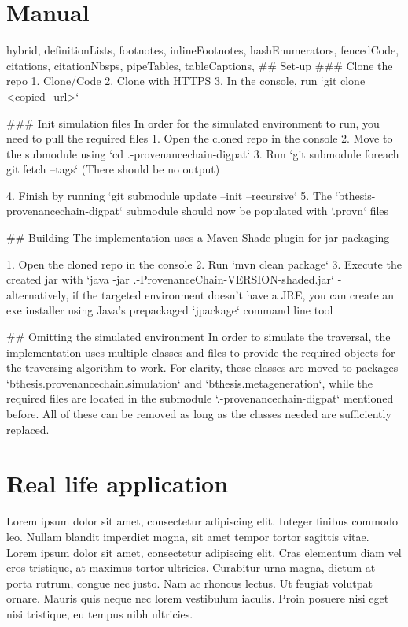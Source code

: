\documentclass[
  digital,     %
  oneside,     %
  nosansbold,  %
  nocolorbold, %
  lof,         %
  lot,         %
]{fithesis4}
\begin{document}
\chapter{Manual}
\begin{markdown*}{%
  hybrid,
  definitionLists,
  footnotes,
  inlineFootnotes,
  hashEnumerators,
  fencedCode,
  citations,
  citationNbsps,
  pipeTables,
  tableCaptions,
}
## Set-up
### Clone the repo
1. Clone/Code
2. Clone with HTTPS
3. In the console, run `git clone <copied_url>`

### Init simulation files
In order for the simulated environment to run, you need to pull the required files
1. Open the cloned repo in the console
2. Move to the submodule using `cd .\src\main\resources\bthesis-provenancechain-digpat`
3. Run `git submodule foreach git fetch --tags` (There should be no output)

4. Finish by running `git submodule update --init --recursive`
5. The `bthesis-provenancechain-digpat` submodule should now be populated with `.provn` files

## Building
The implementation uses a Maven Shade plugin for jar packaging

1. Open the cloned repo in the console
2. Run `mvn clean package`
3. Execute the created jar with `java -jar .\target\BThesis-ProvenanceChain-VERSION-shaded.jar`
    - alternatively, if the targeted environment doesn't have a JRE, you can create an exe installer using Java's prepackaged `jpackage` command line tool
    
\newpage
\shorthandoff{-}
## Omitting the simulated environment
In order to simulate the traversal, the implementation uses multiple classes and files
to provide the required objects for the traversing algorithm to work.
For clarity, these classes are moved to packages `bthesis.provenancechain.simulation` and `bthesis.metageneration`, while the required files are located in the submodule `.\src\main\resources\bthesis-provenancechain-digpat` mentioned before. All of these can be removed as long as the classes needed are sufficiently replaced.
\shorthandon{-}
\end{markdown*}

\chapter{Real life application}
\shorthandoff{-}
Lorem ipsum dolor sit amet, consectetur adipiscing elit. Integer finibus commodo leo. Nullam blandit imperdiet magna, sit amet tempor tortor sagittis vitae. Lorem ipsum dolor sit amet, consectetur adipiscing elit. Cras elementum diam vel eros tristique, at maximus tortor ultricies. Curabitur urna magna, dictum at porta rutrum, congue nec justo. Nam ac rhoncus lectus. Ut feugiat volutpat ornare. Mauris quis neque nec lorem vestibulum iaculis. Proin posuere nisi eget nisi tristique, eu tempus nibh ultricies.
\end{document}
